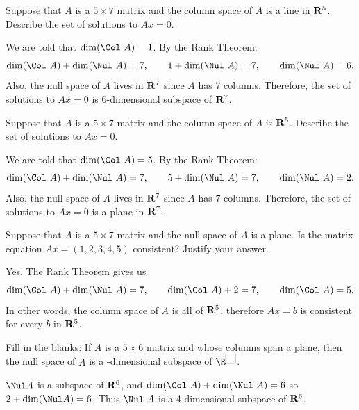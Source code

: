 \begin{problems}
\problem %
Suppose that $A$ is a $5 \times 7$ matrix and the column space of $A$ is a line
in ${\bf R}^5$.  Describe the set of solutions to $Ax = 0$.

\begin{solution}
We are told that $\dim(\Col \ A) = 1$.  By the Rank Theorem:
\[\dim(\Col \ A) + \dim(\Nul \ A) = 7, \qquad
1 + \dim(\Nul \ A) = 7, \qquad \dim(\Nul \ A) = 6.\]
Also, the null space of $A$ lives in ${\bf R}^7$ since $A$ has $7$ columns.
Therefore, the set of solutions to $Ax = 0$ is $6$-dimensional subspace of ${\bf R}^7$.
\end{solution}

\problem %
Suppose that $A$ is a $5 \times 7$ matrix and the column space of $A$ is
${\bf R}^5$.  Describe the set of solutions to $Ax = 0$.

\begin{solution}
We are told that $\dim(\Col \ A) = 5$.  By the Rank Theorem:
\[\dim(\Col \ A) + \dim(\Nul \ A) = 7, \qquad
5 + \dim(\Nul \ A) = 7, \qquad \dim(\Nul \ A) = 2.\]
Also, the null space of $A$ lives in ${\bf R}^7$ since $A$ has $7$ columns.
Therefore, the set of solutions to $Ax = 0$ is a plane in ${\bf R}^7$.
\end{solution}

\problem %
Suppose that $A$ is a $5 \times 7$ matrix and the null space of $A$ is a plane.
Is the matrix equation $Ax = (1, 2, 3, 4, 5)$ consistent?  Justify your answer.

\begin{solution}
Yes.  The Rank Theorem gives us 
\[\dim(\Col \ A) + \dim(\Nul \ A) = 7, \qquad
  \dim(\Col \ A) + 2 = 7, \qquad \dim(\Col \ A) = 5.\] In other words, the
column space of $A$ is all of ${\bf R}^5$, therefore $Ax = b$ is consistent for
every $b$ in ${\bf R}^5$.
\end{solution}


\problem %
Fill in the blanks: If $A$ is a $5 \times 6$ matrix and whose columns span a
plane, then the null space of $A$ is a \underline{\qquad \qquad}-dimensional
subspace of %
$\R^{\fbox{\phantom{\tiny 2}}}$.

\begin{solution}
  $\Nul A$ is a subspace of ${\bf R}^6$, and
  $\dim(\Col \ A)+ \dim(\Nul \ A)=6$ so $2+\dim(\Nul A)=6$.  Thus
  $\Nul \ A$ is a 4-dimensional subspace of ${\bf R}^6$.
\end{solution}





\end{problems}
